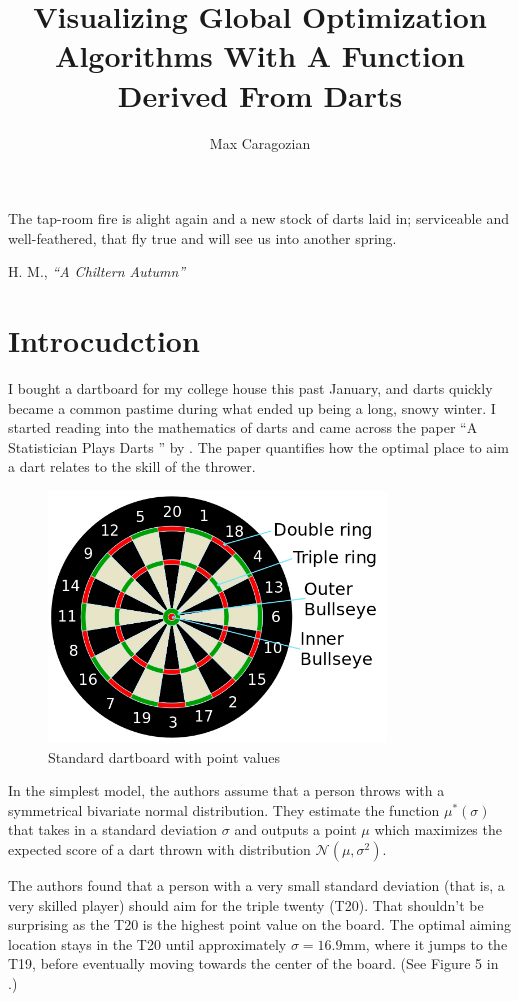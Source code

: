 \documentclass[]{article}
\title{Visualizing Global Optimization Algorithms With A Function Derived From Darts}
\author{Max Caragozian}
\begin{document}
\maketitle


\epigraph{The tap-room fire is alight again and a new stock of darts laid in; serviceable and well-feathered, that fly true and will see us into another spring.}{H. M., \emph{``A Chiltern Autumn''} \cite{1929spectator}}

\section{Introcudction}
I bought a dartboard for my college house this past January, and darts quickly became a common pastime during what ended up being a long, snowy winter. I started reading into the mathematics of darts and came across the paper ``A Statistician Plays Darts \cite{stat}'' by \citeauthor{stat}. The paper quantifies how the optimal place to aim a dart relates to the skill of the thrower.

\begin{figure}
	\centering
	\includegraphics[width=0.8\textwidth]{../images/dartboard_diagram.png}
	\caption{Standard dartboard with point values \cite{diag}}
	\label{fig:diag}
\end{figure}

In the simplest model, the authors assume that a person throws with a symmetrical bivariate normal distribution. They estimate the function $\mu^*(\sigma)$ that takes in a standard deviation $\sigma$ and outputs a point $\mu$ which maximizes the expected score of a dart thrown with distribution $\mathcal{N}(\mu, \sigma^2)$.

The authors found that a person with a very small standard deviation (that is, a very skilled player) should aim for the triple twenty (T20). That shouldn't be surprising as the T20 is the highest point value on the board. The optimal aiming location stays in the T20 until approximately $\sigma=16.9$mm, where it jumps to the T19, before eventually moving towards the center of the board. (See Figure 5 in  \cite{stat}.)
\end{document}
